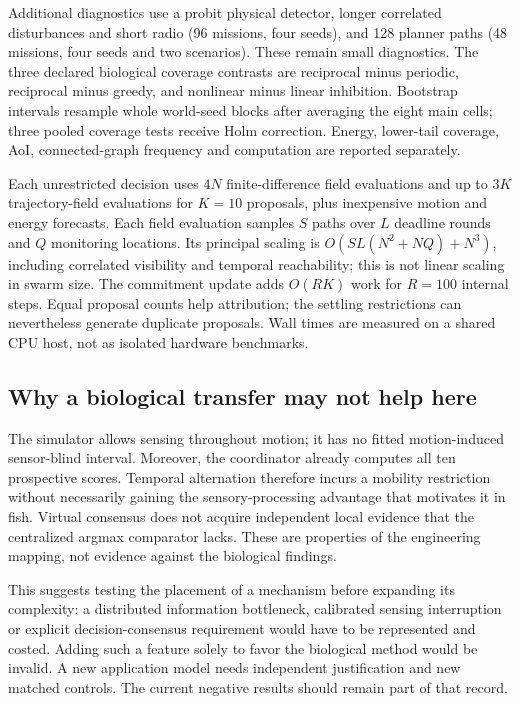 Additional diagnostics use a probit physical detector, longer correlated
disturbances and short radio (96 missions, four seeds), and 128 planner paths
(48 missions, four seeds and two scenarios). These remain small diagnostics.
The three declared biological coverage contrasts are reciprocal minus periodic,
reciprocal minus greedy, and nonlinear minus linear inhibition. Bootstrap
intervals resample whole world-seed blocks after averaging the eight main cells;
three pooled coverage tests receive Holm correction. Energy, lower-tail coverage,
AoI, connected-graph frequency and computation are reported separately.

Each unrestricted decision uses $4N$ finite-difference field evaluations and
up to $3K$ trajectory-field evaluations for $K=10$ proposals, plus inexpensive
motion and energy forecasts. Each field evaluation samples $S$ paths over $L$
deadline rounds and $Q$ monitoring locations. Its principal scaling is
$O(SL(N^2+NQ)+N^3)$, including correlated visibility and temporal reachability;
this is not linear scaling in swarm size. The commitment update adds
$O(RK)$ work for $R=100$ internal steps. Equal proposal counts help attribution;
the settling restrictions can nevertheless generate duplicate proposals.
Wall times are measured on a shared CPU host, not as isolated hardware benchmarks.



\subsection{Why a biological transfer may not help here}
The simulator allows sensing throughout motion; it has no fitted motion-induced
sensor-blind interval. Moreover, the coordinator already computes all ten
prospective scores. Temporal alternation therefore incurs a mobility restriction
without necessarily gaining the sensory-processing advantage that motivates it
in fish. Virtual consensus does not acquire independent local evidence that
the centralized argmax comparator lacks. These are properties of the engineering
mapping, not evidence against the biological findings.



This suggests testing the placement of a mechanism before expanding its
complexity: a distributed information bottleneck, calibrated sensing interruption
or explicit decision-consensus requirement would have to be represented and
costed. Adding such a feature solely to favor the biological method would be
invalid. A new application model needs independent justification and new matched
controls. The current negative results should remain part of that record.

